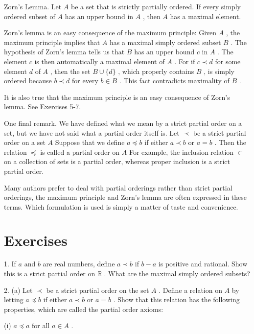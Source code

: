 \documentclass[10pt]{article}
\begin{document}
Zorn's Lemma. Let \(A\) be a set that is strictly partially ordered. If every simply ordered subset of \(A\) has an upper bound in \(A\) , then \(A\) has a maximal element.

Zorn's lemma is an easy consequence of the maximum principle: Given \(A\) , the maximum principle implies that \(A\) has a maximal simply ordered subset \(B\) . The hypothesis of Zorn’s lemma tells us that \(B\) has an upper bound \(c\) in \(A\) . The element \(c\) is then automatically a maximal element of \(A\) . For if \(c \prec  d\) for some element \(d\) of \(A\) , then the set \(B \cup  \{ d\}\) , which properly contains \(B\) , is simply ordered because \(b \prec  d\) for every \(b \in  B\) . This fact contradicts maximality of \(B\) .

It is also true that the maximum principle is an easy consequence of Zorn's lemma. See Exercises 5-7.

One final remark. We have defined what we mean by a strict partial order on a set, but we have not said what a partial order itself is. Let \(\prec\) be a strict partial order on a set \(A\) Suppose that we define \(a \preccurlyeq  b\) if either \(a \prec  b\) or \(a = b\) . Then the relation \(\preccurlyeq\) is called a partial order on \(A\) For example, the inclusion relation \(\subset\) on a collection of sets is a partial order, whereas proper inclusion is a strict partial order.

Many authors prefer to deal with partial orderings rather than strict partial orderings, the maximum principle and Zorn's lemma are often expressed in these terms. Which formulation is used is simply a matter of taste and convenience.

\section*{Exercises}

1. If \(a\) and \(b\) are real numbers, define \(a \prec  b\) if \(b - a\) is positive and rational. Show this is a strict partial order on \(\mathbb{R}\) . What are the maximal simply ordered subsets?

2. (a) Let \(\prec\) be a strict partial order on the set \(A\) . Define a relation on \(A\) by letting \(a \preccurlyeq  b\) if either \(a \prec  b\) or \(a = b\) . Show that this relation has the following properties, which are called the partial order axioms:

(i) \(a \preccurlyeq  a\) for all \(a \in  A\) .
\end{document}
